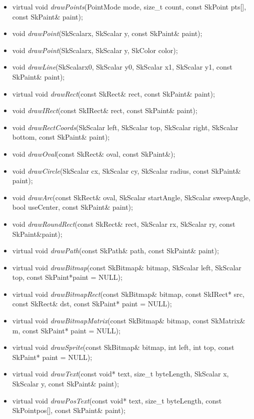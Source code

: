 \begin{enumerate}
\begin{itemize}
  \item virtual void \textit{drawPoints}(PointMode mode, size\_t count, const SkPoint pts[], const SkPaint\& paint);
  \item void \textit{drawPoint}(SkScalarx, SkScalar y, const SkPaint\& paint);
  \item void \textit{drawPoint}(SkScalarx, SkScalar y, SkColor color);
  \item void \textit{drawLine}(SkScalarx0, SkScalar y0, SkScalar x1, SkScalar y1, const SkPaint\& paint);
  \item virtual void \textit{drawRect}(const SkRect\& rect, const SkPaint\& paint);
  \item void \textit{drawIRect}(const SkIRect\& rect, const SkPaint\& paint);
  \item void \textit{drawRectCoords}(SkScalar left, SkScalar top, SkScalar right, SkScalar bottom, const SkPaint\& paint);
  \item void \textit{drawOval}(const SkRect\& oval, const SkPaint\&);
  \item void \textit{drawCircle}(SkScalar cx, SkScalar cy, SkScalar radius, const SkPaint\& paint);
  \item void \textit{drawArc}(const SkRect\& oval, SkScalar startAngle, SkScalar sweepAngle, bool useCenter, const SkPaint\& paint);
  \item void \textit{drawRoundRect}(const SkRect\& rect, SkScalar rx, SkScalar ry, const SkPaint\&paint);
  \item virtual void \textit{drawPath}(const SkPath\& path, const SkPaint\& paint);
  \item virtual void \textit{drawBitmap}(const SkBitmap\& bitmap, SkScalar left, SkScalar top, const SkPaint*paint = NULL);
  \item virtual void \textit{drawBitmapRect}(const SkBitmap\& bitmap, const SkIRect* src, const SkRect\& dst, const SkPaint* paint = NULL);
  \item virtual void \textit{drawBitmapMatrix}(const SkBitmap\& bitmap, const SkMatrix\& m, const SkPaint* paint = NULL);
  \item virtual void \textit{drawSprite}(const SkBitmap\& bitmap, int left, int top, const SkPaint* paint = NULL);
  \item virtual void \textit{drawText}(const void* text, size\_t byteLength, SkScalar x, SkScalar y, const SkPaint\& paint);
  \item virtual void \textit{drawPosText}(const void* text, size\_t byteLength, const SkPointpos[], const SkPaint\& paint);

\end{itemize}
\end{enumerate}

